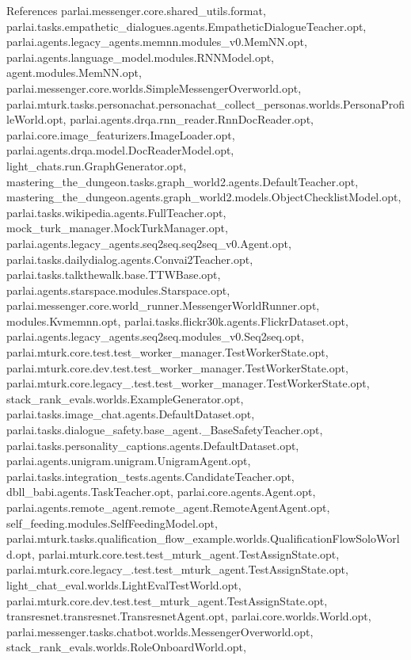 References parlai.\+messenger.\+core.\+shared\+\_\+utils.\+format, parlai.\+tasks.\+empathetic\+\_\+dialogues.\+agents.\+Empathetic\+Dialogue\+Teacher.\+opt, parlai.\+agents.\+legacy\+\_\+agents.\+memnn.\+modules\+\_\+v0.\+Mem\+N\+N.\+opt, parlai.\+agents.\+language\+\_\+model.\+modules.\+R\+N\+N\+Model.\+opt, agent.\+modules.\+Mem\+N\+N.\+opt, parlai.\+messenger.\+core.\+worlds.\+Simple\+Messenger\+Overworld.\+opt, parlai.\+mturk.\+tasks.\+personachat.\+personachat\+\_\+collect\+\_\+personas.\+worlds.\+Persona\+Profile\+World.\+opt, parlai.\+agents.\+drqa.\+rnn\+\_\+reader.\+Rnn\+Doc\+Reader.\+opt, parlai.\+core.\+image\+\_\+featurizers.\+Image\+Loader.\+opt, parlai.\+agents.\+drqa.\+model.\+Doc\+Reader\+Model.\+opt, light\+\_\+chats.\+run.\+Graph\+Generator.\+opt, mastering\+\_\+the\+\_\+dungeon.\+tasks.\+graph\+\_\+world2.\+agents.\+Default\+Teacher.\+opt, mastering\+\_\+the\+\_\+dungeon.\+agents.\+graph\+\_\+world2.\+models.\+Object\+Checklist\+Model.\+opt, parlai.\+tasks.\+wikipedia.\+agents.\+Full\+Teacher.\+opt, mock\+\_\+turk\+\_\+manager.\+Mock\+Turk\+Manager.\+opt, parlai.\+agents.\+legacy\+\_\+agents.\+seq2seq.\+seq2seq\+\_\+v0.\+Agent.\+opt, parlai.\+tasks.\+dailydialog.\+agents.\+Convai2\+Teacher.\+opt, parlai.\+tasks.\+talkthewalk.\+base.\+T\+T\+W\+Base.\+opt, parlai.\+agents.\+starspace.\+modules.\+Starspace.\+opt, parlai.\+messenger.\+core.\+world\+\_\+runner.\+Messenger\+World\+Runner.\+opt, modules.\+Kvmemnn.\+opt, parlai.\+tasks.\+flickr30k.\+agents.\+Flickr\+Dataset.\+opt, parlai.\+agents.\+legacy\+\_\+agents.\+seq2seq.\+modules\+\_\+v0.\+Seq2seq.\+opt, parlai.\+mturk.\+core.\+test.\+test\+\_\+worker\+\_\+manager.\+Test\+Worker\+State.\+opt, parlai.\+mturk.\+core.\+dev.\+test.\+test\+\_\+worker\+\_\+manager.\+Test\+Worker\+State.\+opt, parlai.\+mturk.\+core.\+legacy\+\_.\+test.\+test\+\_\+worker\+\_\+manager.\+Test\+Worker\+State.\+opt, stack\+\_\+rank\+\_\+evals.\+worlds.\+Example\+Generator.\+opt, parlai.\+tasks.\+image\+\_\+chat.\+agents.\+Default\+Dataset.\+opt, parlai.\+tasks.\+dialogue\+\_\+safety.\+base\+\_\+agent.\+\_\+\+Base\+Safety\+Teacher.\+opt, parlai.\+tasks.\+personality\+\_\+captions.\+agents.\+Default\+Dataset.\+opt, parlai.\+agents.\+unigram.\+unigram.\+Unigram\+Agent.\+opt, parlai.\+tasks.\+integration\+\_\+tests.\+agents.\+Candidate\+Teacher.\+opt, dbll\+\_\+babi.\+agents.\+Task\+Teacher.\+opt, parlai.\+core.\+agents.\+Agent.\+opt, parlai.\+agents.\+remote\+\_\+agent.\+remote\+\_\+agent.\+Remote\+Agent\+Agent.\+opt, self\+\_\+feeding.\+modules.\+Self\+Feeding\+Model.\+opt, parlai.\+mturk.\+tasks.\+qualification\+\_\+flow\+\_\+example.\+worlds.\+Qualification\+Flow\+Solo\+World.\+opt, parlai.\+mturk.\+core.\+test.\+test\+\_\+mturk\+\_\+agent.\+Test\+Assign\+State.\+opt, parlai.\+mturk.\+core.\+legacy\+\_.\+test.\+test\+\_\+mturk\+\_\+agent.\+Test\+Assign\+State.\+opt, light\+\_\+chat\+\_\+eval.\+worlds.\+Light\+Eval\+Test\+World.\+opt, parlai.\+mturk.\+core.\+dev.\+test.\+test\+\_\+mturk\+\_\+agent.\+Test\+Assign\+State.\+opt, transresnet.\+transresnet.\+Transresnet\+Agent.\+opt, parlai.\+core.\+worlds.\+World.\+opt, parlai.\+messenger.\+tasks.\+chatbot.\+worlds.\+Messenger\+Overworld.\+opt, stack\+\_\+rank\+\_\+evals.\+worlds.\+Role\+Onboard\+World.\+opt, 